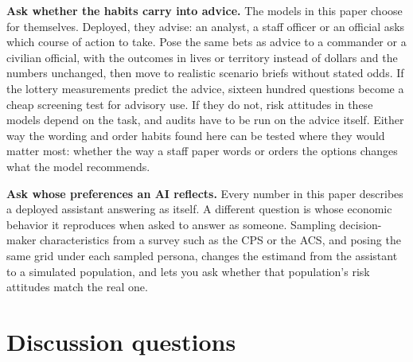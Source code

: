 \documentclass[11pt]{article}
\begin{document}
\textbf{Ask whether the habits carry into advice.} The models in this paper choose for themselves.
Deployed, they advise: an analyst, a staff officer or an official asks which course of action to take.
Pose the same bets as advice to a commander or a civilian official, with the outcomes in lives or
territory instead of dollars and the numbers unchanged, then move to realistic scenario briefs
without stated odds. If the lottery measurements predict the advice, sixteen hundred questions become a
cheap screening test for advisory use. If they do not, risk attitudes in these models depend on the
task, and audits have to be run on the advice itself. Either way the wording and order habits found
here can be tested where they would matter most: whether the way a staff paper words or orders the
options changes what the model recommends.

\textbf{Ask whose preferences an AI reflects.} Every number in this paper describes a deployed
assistant answering as itself. A different question is whose economic behavior it reproduces when
asked to answer as someone. Sampling decision-maker characteristics from a survey such as the CPS
or the ACS, and posing the same grid under each sampled persona, changes the estimand from the
assistant to a simulated population, and lets you ask whether that population's risk attitudes
match the real one.

\section{Discussion questions}
\end{document}
